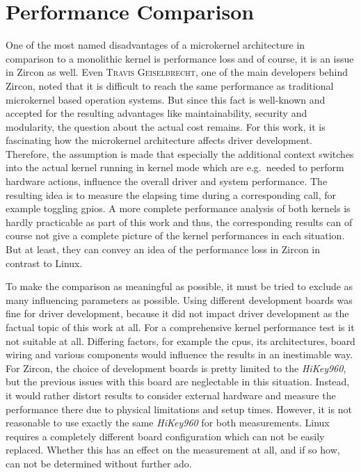 \section{Performance Comparison}
One of the most named disadvantages of a microkernel architecture in comparison to a monolithic kernel is performance loss and of course, it is an issue in Zircon as well.
Even \textsc{Travis Geiselbrecht}, one of the main developers behind Zircon, noted that it is difficult to reach the same performance as traditional microkernel based operation systems\cite{chat-zircon-arch}.
But since this fact is well-known and accepted for the resulting advantages like maintainability, security and modularity, the question about the actual cost remains.
For this work, it is fascinating how the microkernel architecture affects driver development.
Therefore, the assumption is made that especially the additional context switches into the actual kernel running in kernel mode which are e.g.\ needed to perform hardware actions, influence the overall driver and system performance.
The resulting idea is to measure the elapsing time during a corresponding call, for example toggling \acp{gpio}.
A more complete performance analysis of both kernels is hardly practicable as part of this work and thus, the corresponding results can of course not give a complete picture of the kernel performances in each situation.
But at least, they can convey an idea of the performance loss in Zircon in contrast to Linux.

To make the comparison as meaningful as possible, it must be tried to exclude as many influencing parameters as possible.
Using different development boards was fine for driver development, because it did not impact driver development as the factual topic of this work at all.
For a comprehensive kernel performance test is it not suitable at all.
Differing factors, for example the \acp{cpu}, its architectures, board wiring and various components would influence the results in an inestimable way.
For Zircon, the choice of development boards is pretty limited to the \textit{HiKey960}, but the previous issues with this board are neglectable in this situation.
Instead, it would rather distort results to consider external hardware and measure the performance there due to physical limitations and setup times.
However, it is not reasonable to use exactly the same \textit{HiKey960} for both measurements.
Linux requires a completely different board configuration which can not be easily replaced.
Whether this has an effect on the measurement at all, and if so how, can not be determined without further ado.


